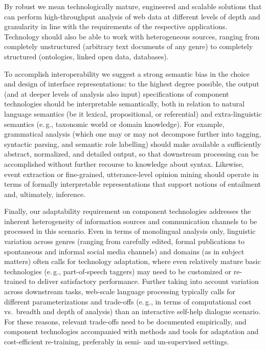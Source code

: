 \documentclass[10pt, plain]{../../metanetpaper}
\begin{document}
\begin{multicols}{2}
By robust we mean technologically mature, engineered and scalable solutions that can perform high-throughput analysis of web data at different levels of depth and granularity in line with the requirements of the respective applications. Technology should also be able to work with heterogeneous sources, ranging from completely unstructured (arbitrary text documents of any genre) to completely structured (ontologies, linked open data, databases).

To accomplish interoperability we suggest a strong semantic bias in the choice and design of interface representations: to the highest degree possible, the output (and at deeper levels of analysis also input) specifications of component technologies should be interpretable semantically, both in relation to natural language semantics (be it lexical, propositional, or referential) and extra-linguistic semantics (e.\,g., taxonomic world or domain knowledge). For example, grammatical analysis (which one may or may not decompose further into tagging, syntactic parsing, and semantic role labelling) should make available a sufficiently abstract, normalized, and detailed output, so that downstream processing can be accomplished without further recourse to knowledge about syntax. Likewise, event extraction or fine-grained, utterance-level opinion mining should operate in terms of formally interpretable representations that support notions of entailment and, ultimately, inference.

Finally, our adaptability requirement on component technologies addresses the inherent heterogeneity of information sources and communication channels to be processed in this scenario.  Even in terms of monolingual analysis only, linguistic variation across genres (ranging from carefully edited, formal publications to spontaneous and informal social media channels) and domains (as in subject matters) often calls for technology adaptation, where even relatively mature basic technologies (e.\,g., part-of-speech taggers) may need to be customized or re-trained to deliver satisfactory performance. Further taking into account variation across downstream tasks, web-scale language processing typically calls for different parameterizations and trade-offs (e.\,g., in terms of computational cost vs.~breadth and depth of analysis) than an interactive self-help dialogue scenario. For these reasons, relevant trade-offs need to be documented empirically, and component technologies accompanied with methods and tools for adaptation and cost-efficient re-training, preferably in semi- and un-supervised settings.
 

\end{multicols}
\end{document}
